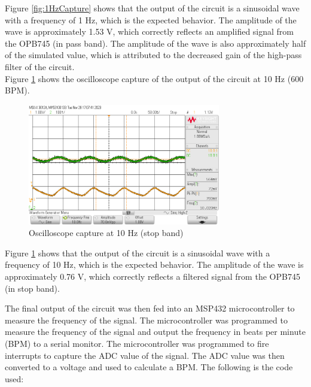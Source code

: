 \documentclass[CMPE]{KGCOEReport}
\begin{document}
Figure \ref{fig:1HzCapture} shows that the output of the circuit is a sinusoidal wave with a frequency of 1 Hz, which is the expected behavior. The amplitude of the wave is approximately 1.53 V, which correctly reflects an amplified signal from the OPB745 (in pass band). The amplitude of the wave is also approximately half of the simulated value, which is attributed to the decreased gain of the high-pass filter of the circuit.\\

Figure \ref{fig:10HzCapture} shows the oscilloscope capture of the output of the circuit at 10 Hz (600 BPM).

\begin{figure}[H]
    \centering
    \includegraphics[width=0.75\textwidth]{10Hz.png}
    \caption{Oscilloscope capture at 10 Hz (stop band)}
    \label{fig:10HzCapture}
\end{figure}

Figure \ref{fig:10HzCapture} shows that the output of the circuit is a sinusoidal wave with a frequency of 10 Hz, which is the expected behavior. The amplitude of the wave is approximately 0.76 V, which correctly reflects a filtered signal from the OPB745 (in stop band).

\bigskip

The final output of the circuit was then fed into an MSP432 microcontroller to measure the frequency of the signal. The microcontroller was programmed to measure the frequency of the signal and output the frequency in beats per minute (BPM) to a serial monitor. The microcontroller was programmed to fire interrupts to capture the ADC value of the signal. The ADC value was then converted to a voltage and used to calculate a BPM. The following is the code used:
\end{document}
